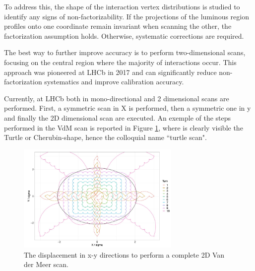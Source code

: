 To address this, the shape of the interaction vertex distributions is studied to identify any signs of non-factorizability. If the projections of the luminous region profiles onto one coordinate remain invariant when scanning the other, the factorization assumption holds. Otherwise, systematic corrections are required.

\sloppy The best way to further improve accuracy is to perform two-dimensional scans, focusing on the central region where the majority of interactions occur. This approach was pioneered at LHCb in 2017 and can significantly reduce non-factorization systematics and improve calibration accuracy\cite{Balagura_2021}.

Currently, at LHCb both in mono-directional and 2 dimensional scans are performed. First, a symmetric scan in X is performed, then a symmetric one in y and finally the 2D dimensional scan are executed. An exemple of the steps performed in the VdM scan is reported in Figure \ref{fig:vdm_steps_xy}, where is clearly visible the Turtle or Cherubin-shape, hence the colloquial name ``turtle scan".

\begin{figure}
    \centering
    \includegraphics[width=0.7\textwidth]{figures/vdm_steps_xy.png}
    \caption{The displacement in x-y directions to perform a complete 2D Van der Meer scan.}
    \label{fig:vdm_steps_xy}
\end{figure}



